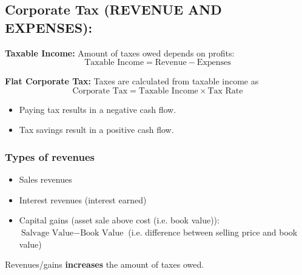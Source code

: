 \subsection{Corporate Tax (REVENUE AND EXPENSES):}
\begin{definition}
    \textbf{Taxable Income:} Amount of taxes owed depends on profits:
    \begin{equation*}
        \text{Taxable Income} = \text{Revenue} - \text{Expenses}
    \end{equation*}
    \vspace{1em}

    \textbf{Flat Corporate Tax:} Taxes are calculated from taxable income as
    \begin{equation*}
        \text{Corporate Tax} = \text{Taxable Income} \times \text{Tax Rate}
    \end{equation*}
    \begin{itemize}
        \item Paying tax results in a negative cash flow.
        \item Tax savings result in a positive cash flow.
    \end{itemize}  
    
\end{definition}

\subsubsection{Types of revenues}
\begin{terminology}
    \begin{itemize}
        \item Sales revenues
        \item Interest revenues (interest earned)
        \item Capital gains (asset sale above cost (i.e. book value)): $\text{Salvage Value} - \text{Book Value}$ (i.e. difference between selling price and book value)
    \end{itemize}
\end{terminology}

\begin{warning}
    Revenues/gains \textbf{increases} the amount of taxes owed.
\end{warning}

